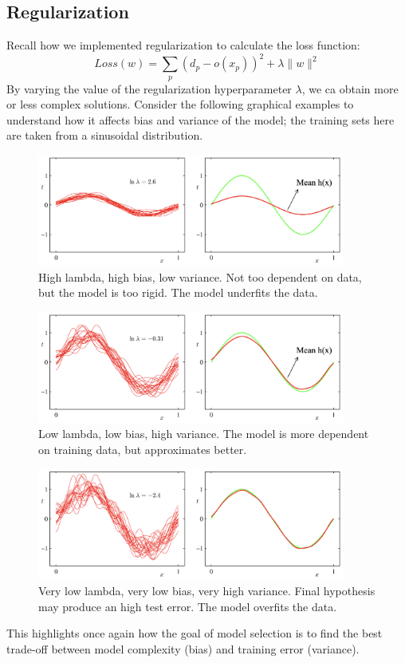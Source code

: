 \subsection{Regularization}

Recall how we implemented regularization to calculate the loss function:
\begin{equation*}
    Loss(w) = \sum_p (d_p - o(x_p))^2 + \lambda \|w\|^2
\end{equation*}
By varying the value of the regularization hyperparameter $\lambda$, we ca obtain more or less complex solutions. Consider the following graphical examples to understand how it affects bias and variance of the model; the training sets here are taken from a sinusoidal distribution.

\begin{figure}[H]
    \centering
    \includegraphics[width=0.9\textwidth]{img/BiasVar1.png}
    \caption{High lambda, high bias, low variance. Not too dependent on data, but the model is too rigid. The model underfits the data.}
\end{figure}
\begin{figure}[H]
    \centering
    \includegraphics[width=0.9\textwidth]{img/BiasVar2.png}
    \caption{Low lambda, low bias, high variance. The model is more dependent on training data, but approximates better.}
\end{figure}
\begin{figure}[H]
    \centering
    \includegraphics[width=0.9\textwidth]{img/BiasVar3.png}
    \caption{Very low lambda, very low bias, very high variance. Final hypothesis may produce an high test error. The model overfits the data.}
\end{figure}
This highlights once again how the goal of model selection is to find the best trade-off between model complexity (bias) and training error (variance).

